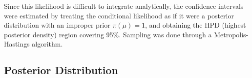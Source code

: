 \documentclass[12pt,twoside]{dukestatscithesis}
\theoremstyle{definition}
\theoremstyle{definition}
\theoremstyle{definition}
\theoremstyle{remark}
\begin{document}
Since this likelihood is difficult to integrate analytically, the
confidence intervals were estimated by treating the conditional
likelihood as if it were a posterior distribution with an improper prior
\(\pi(\mu) = 1\), and obtaining the HPD (highest posterior density)
region covering 95\%. Sampling was done through a Metropolis-Hastings
algorithm.

\subsection{Posterior Distribution}\label{posterior-distribution}
\begin{Shaded}
\begin{Highlighting}[]
\StringTok{ }\NormalTok{)\{}
\StringTok{ }
\StringTok{ }\NormalTok{(}\OperatorTok{-}\OperatorTok{/}
\StringTok{  }\OperatorTok{+}\NormalTok{)}\OperatorTok{^}\NormalTok{(}\OperatorTok{-}\NormalTok{)}\OperatorTok{*}\OperatorTok{^}\OperatorTok{*}\OperatorTok{^}\OperatorTok{/}\NormalTok{(}\OperatorTok{*}\OperatorTok{+}\NormalTok{)))}
\StringTok{ }\OperatorTok{*}\OperatorTok{/}\NormalTok{(}\OperatorTok{+}\OperatorTok{*}

\StringTok{ }\NormalTok{(}
    \OperatorTok{<}\NormalTok{(}\OperatorTok{-}\NormalTok{(}\NormalTok{, }\NormalTok{, }\NormalTok{), }\NormalTok{(}\NormalTok{,}\OperatorTok{*}\OperatorTok{/}\OperatorTok{+}\NormalTok{), }\NormalTok{(}\OperatorTok{/}\OperatorTok{+}\NormalTok{))))}
\NormalTok{  \})}
\NormalTok{  (}\NormalTok{(}
  
\NormalTok{\}}
\end{Highlighting}
\end{Shaded}
\end{document}
